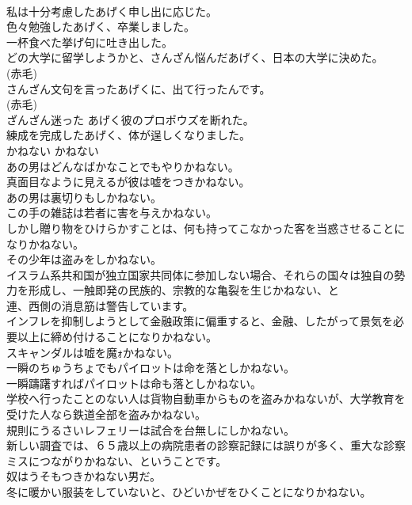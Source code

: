 \documentclass[8pt]{extreport}
\begin{document}
\begin{CJK}{UTF8}{min}
\\	私は十分考慮したあげく申し出に応じた。  
\\	色々勉強したあげく、卒業しました。   
\\	一杯食べた挙げ句に吐き出した。  
\\	どの大学に留学しようかと、さんざん悩んだあげく、日本の大学に決めた。  
\\	(赤毛)
\\	さんざん文句を言ったあげくに、出て行ったんです。  
\\	(赤毛)
\\	ざんざん迷った あげく彼のプロポウズを断れた。  
\\	練成を完成したあげく、体が逞しくなりました。  
\\	かねない	かねない	
\\	あの男はどんなばかなことでもやりかねない。  
\\	真面目なように見えるが彼は嘘をつきかねない。  
\\	あの男は裏切りもしかねない。   
\\	この手の雑誌は若者に害を与えかねない。   
\\	しかし贈り物をひけらかすことは、何も持ってこなかった客を当惑させることになりかねない。   
\\	その少年は盗みをしかねない。   
\\	イスラム系共和国が独立国家共同体に参加しない場合、それらの国々は独自の勢力を形成し、一触即発の民族的、宗教的な亀裂を生じかねない、と
\\	連、西側の消息筋は警告しています。   
\\	インフレを抑制しようとして金融政策に偏重すると、金融、したがって景気を必要以上に締め付けることになりかねない。   
\\	スキャンダルは嘘を魔ｫかねない。   
\\	一瞬のちゅうちょでもパイロットは命を落としかねない。   
\\	一瞬躊躇すればパイロットは命も落としかねない。   
\\	学校へ行ったことのない人は貨物自動車からものを盗みかねないが、大学教育を受けた人なら鉄道全部を盗みかねない。   
\\	規則にうるさいレフェリーは試合を台無しにしかねない。   
\\	新しい調査では、６５歳以上の病院患者の診察記録には誤りが多く、重大な診察ミスにつながりかねない、ということです。   
\\	奴はうそもつきかねない男だ。   
\\	冬に暖かい服装をしていないと、ひどいかぜをひくことになりかねない。   

\end{CJK}
\end{document}
